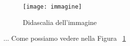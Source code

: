 \begin{figure}[H]
	\centering
	\texttt{[image: immagine]}
	\caption{Didascalia dell'immagine}
	\label{fig:nomedescrittivo}
\end{figure}
...
Come possiamo vedere nella Figura~
\ref{fig:nomedescrittivo}